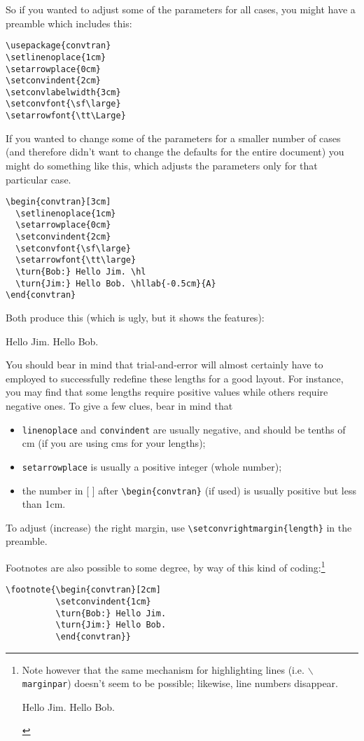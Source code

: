 \documentclass[a4paper]{article}
\begin{document}
So if you wanted to adjust some of the parameters for all cases, you might
have a preamble which includes this:
\begin{verbatim}
\usepackage{convtran}
\setlinenoplace{1cm}
\setarrowplace{0cm}
\setconvindent{2cm}
\setconvlabelwidth{3cm}
\setconvfont{\sf\large}
\setarrowfont{\tt\Large}
\end{verbatim}
If you wanted to change some of the parameters for a smaller number of
cases (and therefore didn't want to change the defaults for the entire
document) you might do something like this, which adjusts the
parameters only for that particular case.
\begin{verbatim}
\begin{convtran}[3cm]
  \setlinenoplace{1cm}
  \setarrowplace{0cm}
  \setconvindent{2cm}
  \setconvfont{\sf\large}
  \setarrowfont{\tt\large}
  \turn{Bob:} Hello Jim. \hl
  \turn{Jim:} Hello Bob. \hllab{-0.5cm}{A}
\end{convtran}
\end{verbatim}
Both produce this (which is ugly, but it shows the features):
\begin{convtran}[3cm]
  \setlinenoplace{1cm}
  \setarrowplace{0cm}
  \setconvindent{2cm}
  \setconvfont{\sf}
  \setarrowfont{\tt}
   Hello Jim. \hl
   Hello Bob. 
\end{convtran}

You should bear in mind that trial-and-error will almost certainly
have to employed to successfully redefine these lengths for a good
layout.  For instance, you may find that some lengths require positive
values while others require negative ones.  To give a few clues, bear
in mind that 
\begin{itemize}
\item \verb!linenoplace! and \verb!convindent! are usually negative,
  and should be tenths of cm (if you are using cms for your lengths);
\item \verb!setarrowplace! is usually a positive integer (whole number);
\item the number in [ ] after \verb!\begin{convtran}! (if used) is
  usually positive but less than 1cm.
\end{itemize}

To adjust (increase) the right margin, use
\verb!\setconvrightmargin{length}! in the preamble.

Footnotes are also possible to some degree, by way of this kind of
coding:\footnote{Note however that the same mechanism for highlighting
  lines (i.e. $\backslash$\texttt{marginpar}) doesn't seem to be possible;
  likewise, line numbers disappear.
    \begin{convtran}[2cm]
    \setconvindent{1cm}
     Hello Jim.  
     Hello Bob.
    \end{convtran}}
\begin{verbatim}
\footnote{\begin{convtran}[2cm]
          \setconvindent{1cm}
          \turn{Bob:} Hello Jim.  
          \turn{Jim:} Hello Bob.
          \end{convtran}}
\end{verbatim}
\end{document}
